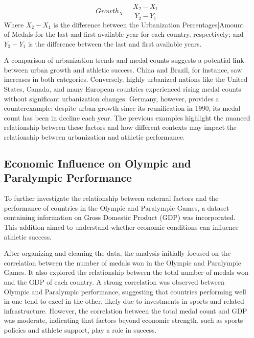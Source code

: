 \documentclass{article}
\begin{document}
\[Growth_X = \frac{X_2 - X_1}{Y_2 - Y_1} \]
Where $X_2 - X_1$ is the difference between the Urbanization Percentages|Amount of Medals for the last and first available year for each country, respectively; and $Y_2 - Y_1$ is the difference between the last and first available years.

A comparison of urbanization trends and medal counts suggests a potential link between urban growth and athletic success. China and Brazil, for instance, saw increases in both categories. Conversely, highly urbanized nations like the United States, Canada, and many European countries experienced rising medal counts without significant urbanization changes. Germany, however, provides a counterexample: despite urban growth since its reunification in 1990, its medal count has been in decline each year. The previous examples highlight the nuanced relationship between these factors and how different contexts may impact the relationship between urbanization and athletic performance.

\subsection{Economic Influence on Olympic and Paralympic Performance}

To further investigate the relationship between external factors and the performance of countries in the Olympic and Paralympic Games, a dataset containing information on Gross Domestic Product (GDP) was incorporated. This addition aimed to understand whether economic conditions can influence athletic success.

After organizing and cleaning the data, the analysis initially focused on the correlation between the number of medals won in the Olympic and Paralympic Games. It also explored the relationship between the total number of medals won and the GDP of each country. A strong correlation was observed between Olympic and Paralympic performance, suggesting that countries performing well in one tend to excel in the other, likely due to investments in sports and related infrastructure. However, the correlation between the total medal count and GDP was moderate, indicating that factors beyond economic strength, such as sports policies and athlete support, play a role in success.
\end{document}
